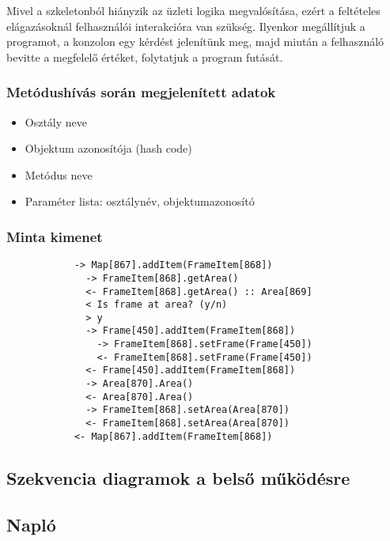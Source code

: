 		Mivel a szkeletonból hiányzik az üzleti logika megvalósítása, ezért a feltételes elágazásoknál felhasználói interakcióra van szükség. Ilyenkor megállítjuk a programot, a konzolon egy kérdést jelenítünk meg, majd miután a felhasználó bevitte a megfelelő értéket, folytatjuk a program futását.
		
		\subsubsection*{Metódushívás során megjelenített adatok}
			\begin{itemize}
				\item Osztály neve
				\item Objektum azonosítója (hash code)
				\item Metódus neve
				\item Paraméter lista: osztálynév, objektumazonosító
			\end{itemize}					
		
		\subsubsection*{Minta kimenet}
			\begin{verbatim}
			-> Map[867].addItem(FrameItem[868])
			  -> FrameItem[868].getArea()
			  <- FrameItem[868].getArea() :: Area[869]
			  < Is frame at area? (y/n)
			  > y
			  -> Frame[450].addItem(FrameItem[868])
			    -> FrameItem[868].setFrame(Frame[450])
			    <- FrameItem[868].setFrame(Frame[450])
			  <- Frame[450].addItem(FrameItem[868])
			  -> Area[870].Area()
			  <- Area[870].Area()
			  -> FrameItem[868].setArea(Area[870])
			  <- FrameItem[868].setArea(Area[870])
			<- Map[867].addItem(FrameItem[868])
			\end{verbatim}
	
	\subsection{Szekvencia diagramok a belső működésre}
	
	\subsection{Napló}

